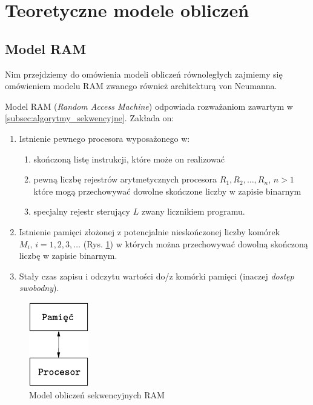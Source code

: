 \newpage


\section{Teoretyczne modele obliczeń }
\subsection{Model RAM}
Nim przejdziemy do omówienia modeli obliczeń równoległych zajmiemy się omówieniem modelu RAM zwanego również architekturą von Neumanna.

Model RAM (\emph{Random Access Machine}) odpowiada rozważaniom zawartym w \ref{subsec:algorytmy_sekwencyjne}. Zakłada on:

\begin{enumerate}
\item{Istnienie pewnego procesora wyposażonego w:
\begin{enumerate}
\item skończoną listę instrukcji, które może on realizować
\item pewną liczbę rejestrów arytmetycznych procesora \(R_1, R_2, \dots, R_n\), \(n>1\) które mogą przechowywać dowolne skończone liczby w zapisie binarnym
\item specjalny rejestr sterujący \(L\) zwany licznikiem programu.
\end{enumerate}}
\item Istnienie pamięci złożonej z potencjalnie nieskończonej liczby komórek \(M_i, \, i=1, 2, 3, \dots\) (Rys. \ref{fig:ram}) w których można przechowywać dowolną skończoną liczbę w zapisie binarnym.
\item Stały czas zapisu i odczytu wartości do/z komórki pamięci (inaczej \emph{dostęp swobodny}).

\end{enumerate}

\begin{figure}[h]
\centering
\includegraphics[width=7em]{./images/Rys_RAM.eps}
\caption{Model obliczeń sekwencyjnych RAM}
\label{fig:ram}
\end{figure}

